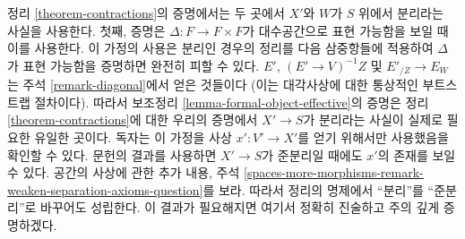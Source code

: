 \begin{remark}
\label{remark-separated-needed}
정리 \ref{theorem-contractions}의 증명에서는 두 곳에서 $X'$와 $W$가
$S$ 위에서 분리라는 사실을 사용한다. 첫째, 증명은
$\Delta : F \to F \times F$가 대수공간으로 표현 가능함을 보일 때
이를 사용한다. 이 가정의 사용은 분리인 경우의 정리를
다음 삼중항들에 적용하여 $\Delta$가 표현 가능함을 증명하면 완전히 피할 수 있다.
$E'$, $(E' \to V)^{-1}Z$ 및 $E'_{/Z} \to E_W$
는 주석 \ref{remark-diagonal}에서 얻은 것들이다
(이는 대각사상에 대한 통상적인 부트스트랩 절차이다).
따라서 보조정리 \ref{lemma-formal-object-effective}의 증명은
정리 \ref{theorem-contractions}에 대한 우리의 증명에서
$X' \to S$가 분리라는 사실이 실제로 필요한 유일한 곳이다.
독자는 이 가정을 사상 $x' : V' \to X'$를 얻기 위해서만 사용했음을
확인할 수 있다. 문헌의 결과를 사용하면 $X' \to S$가 준분리일 때에도
$x'$의 존재를 보일 수 있다. 공간의 사상에 관한 추가 내용, 주석
\ref{spaces-more-morphisms-remark-weaken-separation-axioms-question}를 보라.
따라서 정리의 명제에서 “분리”를 “준분리”로 바꾸어도 성립한다.
이 결과가 필요해지면 여기서 정확히 진술하고 주의 깊게 증명하겠다.
\end{remark}





















